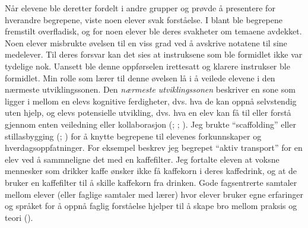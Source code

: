 \documentclass[main.tex]{subfiles}
\begin{document}
\newline
\newline
Når elevene ble deretter fordelt i andre grupper og prøvde å presentere for hverandre begrepene, 
viste noen elever svak forståelse. I blant ble begrepene fremstilt overfladisk, og for noen elever 
ble deres svakheter om temaene avdekket. Noen elever misbrukte øvelsen til en viss grad ved å 
avskrive notatene til sine medelever. Til deres forsvar kan det sies at instruksene som ble formidlet 
ikke var tydelige nok. Uansett ble denne oppførselen irettesatt og klarere instrukser ble formidlet.
\newline
\newline
Min rolle som lærer til denne øvelsen lå i å veilede elevene i den nærmeste utviklingssonen.
Den \emph{nærmeste utviklingssonen} beskriver en sone som ligger i mellom en elevs kognitive 
ferdigheter, dvs. hva de kan oppnå selvstendig uten hjelp, og elevs potensielle utvikling, dvs. 
hva en elev kan få til eller forstå gjennom enten veiledning eller kollaborasjon 
(; ; ). Jeg brukte ``scaffolding'' 
eller stillasbygging (; ) for å knytte begrepene til elevenes 
forkunnskaper og hverdagsoppfatninger. For eksempel beskrev jeg begrepet ``aktiv transport'' for
en elev ved å sammneligne det med en kaffefilter. Jeg fortalte eleven at voksne mennesker som 
drikker kaffe ønsker ikke få kaffekorn i deres kaffedrink, og at de bruker en kaffefilter til å
skille kaffekorn fra drinken. Gode fagsentrerte samtaler mellom elever (eller faglige samtaler 
med lærer) hvor elever bruker egne erfaringer og språket for å oppnå faglig forståelse hjelper 
til å skape bro mellom praksis og teori ().
\end{document}
